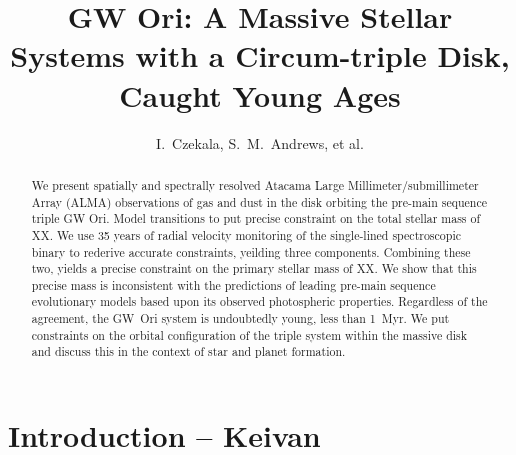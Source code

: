 \documentclass{aastex6}
\begin{document}
\title{GW Ori: A Massive Stellar Systems with a Circum-triple Disk, Caught Young Ages}
\author{I.~Czekala, S.~M.~Andrews, et al.} %

\begin{abstract}
We present spatially and spectrally resolved Atacama Large Millimeter/submillimeter Array (ALMA) observations of gas and dust in the disk orbiting the pre-main sequence triple GW Ori. Model transitions to put precise constraint on the total stellar mass of XX. We use 35 years of radial velocity monitoring of the single-lined spectroscopic binary to rederive accurate constraints, yeilding three components. Combining these two, yields a precise constraint on the primary stellar mass of XX. We show that this precise mass is inconsistent with the predictions of leading pre-main sequence evolutionary models based upon its observed photospheric properties. Regardless of the agreement, the GW~Ori system is undoubtedly young, less than 1~Myr. We put constraints on the orbital configuration of the triple system within the massive disk and discuss this in the context of star and planet formation.
\end{abstract}


\section{Introduction -- {\bf Keivan} \label{sec:intro}}
\end{document}
